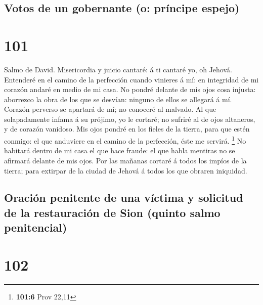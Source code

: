 \hypertarget{votos-de-un-gobernante-o-pruxedncipe-espejo}{%
\subsection{Votos de un gobernante (o: príncipe
espejo)}\label{votos-de-un-gobernante-o-pruxedncipe-espejo}}

\hypertarget{section-100}{%
\section{101}\label{section-100}}

 Salmo de David. Misericordia y juicio cantaré: á ti cantaré
yo, oh Jehová.  Entenderé en el camino de la perfección
cuando vinieres á mí: en integridad de mi corazón andaré en medio de mi
casa.  No pondré delante de mis ojos cosa injusta: aborrezco
la obra de los que se desvían: ninguno de ellos se allegará á mí.
 Corazón perverso se apartará de mí; no conoceré al malvado.
 Al que solapadamente infama á su prójimo, yo le cortaré; no
sufriré al de ojos altaneros, y de corazón vanidoso.  Mis
ojos pondré en los fieles de la tierra, para que estén conmigo: el que
anduviere en el camino de la perfección, éste me servirá. \footnote{\textbf{101:6}
  Prov 22,11}  No habitará dentro de mi casa el que hace
fraude: el que habla mentiras no se afirmará delante de mis ojos.
 Por las mañanas cortaré á todos los impíos de la tierra;
para extirpar de la ciudad de Jehová á todos los que obraren iniquidad.

\hypertarget{oraciuxf3n-penitente-de-una-vuxedctima-y-solicitud-de-la-restauraciuxf3n-de-sion-quinto-salmo-penitencial}{%
\subsection{Oración penitente de una víctima y solicitud de la
restauración de Sion (quinto salmo
penitencial)}\label{oraciuxf3n-penitente-de-una-vuxedctima-y-solicitud-de-la-restauraciuxf3n-de-sion-quinto-salmo-penitencial}}

\hypertarget{section-101}{%
\section{102}\label{section-101}}

